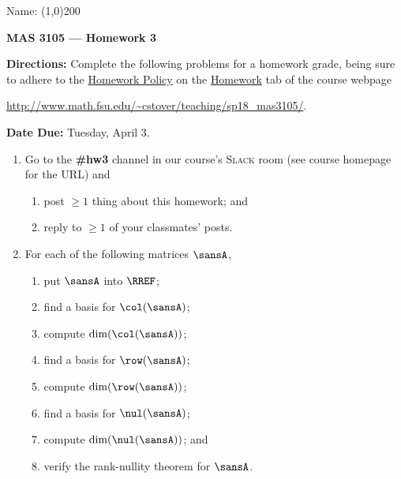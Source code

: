 \documentclass[12 pt]{article}
\begin{document}
\begin{flushright}Name: \line(1,0){200}\end{flushright}
\begin{center}
\Large{\textbf{MAS 3105 --- Homework 3}}
\end{center}
\textbf{Directions:} Complete the following problems for a homework grade, being sure to adhere to the \ul{Homework Policy} on the \ul{Homework} tab of the course webpage
\begin{center}
	 \url{http://www.math.fsu.edu/~cstover/teaching/sp18_mas3105/}.
\end{center}
\textbf{Date Due:} Tuesday, April 3.
\vspace{0.125in}
\begin{enumerate}[leftmargin=0in, rightmargin=-0.25in]
	\item Go to the \textbf{\#hw3} channel in our course's \textsc{Slack} room (see course homepage for the URL) and 
	\begin{enumerate}[label=(\roman*),itemsep=0mm] 
		\item post $\geq 1$ thing about this homework; and 
		\item reply to $\geq 1$ of your classmates' posts.
	\end{enumerate}
	
	
	\vspace{-0.375in}
	
	\item For each of the following matrices $\sansA$,
	\begin{enumerate}[label=(\roman*),leftmargin=16mm,itemsep=2.5mm]
		\item put $\sansA$ into $\RREF$;
		\item find a basis for $\col(\sansA)$;
		\item compute $\dim(\col(\sansA))$;
		\item find a basis for $\row(\sansA)$;
		\item compute $\dim(\row(\sansA))$;
		\item find a basis for $\nul(\sansA)$;
		\item compute $\dim(\nul(\sansA))$; and
		\item verify the rank-nullity theorem for $\sansA$.
	\end{enumerate}
	
	\vspace{3mm}


\end{enumerate}
\end{document}
